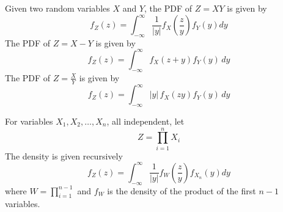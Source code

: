 Given two random variables $X$ and $Y$, the
PDF of $Z = XY$ is given by
\begin{equation}
    f_Z(z) = \int_{-\infty}^{\infty} \frac{1}{|y|} f_X(\frac{z}{y}) f_Y(y) dy
\end{equation}
The PDF of $Z = X - Y$ is given by
\begin{equation}
    f_Z(z) = \int_{-\infty}^{\infty} f_X(z + y) f_Y(y) \, dy
\end{equation}
The PDF of $Z = \frac{X}{Y}$ is given by
\begin{equation}
    f_Z(z) = \int_{-\infty}^{\infty} |y| \, f_X(z y) f_Y(y) \, dy
\end{equation}

For variables $X_1, X_2, \dots, X_n$, all
independent, let
\begin{equation}
    Z = \prod_{i = 1}^{n} X_i
\end{equation}
The density is given recursively
\begin{equation}
    f_Z(z) = \int_{-\infty}^{\infty} \frac{1}{|y|} f_W(\frac{z}{y}) f_{X_n}(y) dy
\end{equation}
where $W = \prod_{i=1}^{n-1}$ and $f_W$ is the
density of the product of the first $n - 1$ variables.

